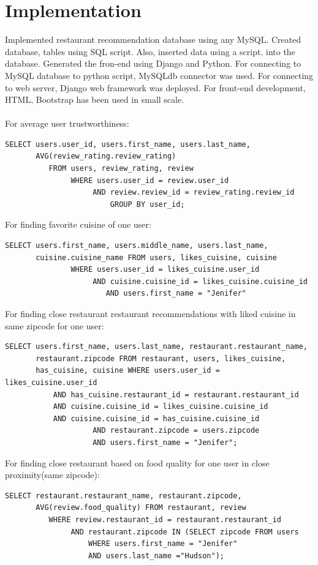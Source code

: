 \documentclass[12pt]{report}
\begin{document}
\section*{Implementation}
Implemented restaurant recommendation database using any MySQL. Created database, tables using SQL script. Also, inserted data using a script.
into the database. Generated the fron-end using Django and Python. For connecting to MySQL database to python script, MySQLdb connector was used. For connecting to web server, Django web framework was deployed. For front-end development, HTML, Bootstrap has been used in small scale.\\\\
For average user trustworthiness:
\begin{verbatim}
SELECT users.user_id, users.first_name, users.last_name,
       AVG(review_rating.review_rating)
          FROM users, review_rating, review
               WHERE users.user_id = review.user_id 
                    AND review.review_id = review_rating.review_id
                        GROUP BY user_id;
\end{verbatim}
For finding favorite cuisine of one user:
\begin{verbatim}
SELECT users.first_name, users.middle_name, users.last_name,
       cuisine.cuisine_name FROM users, likes_cuisine, cuisine
               WHERE users.user_id = likes_cuisine.user_id 
                    AND cuisine.cuisine_id = likes_cuisine.cuisine_id
                       AND users.first_name = "Jenifer"
\end{verbatim}
For finding close restaurant restaurant recommendations with liked cuisine in same zipcode for one user:
\begin{verbatim}
SELECT users.first_name, users.last_name, restaurant.restaurant_name,
       restaurant.zipcode FROM restaurant, users, likes_cuisine,
       has_cuisine, cuisine WHERE users.user_id = likes_cuisine.user_id
           AND has_cuisine.restaurant_id = restaurant.restaurant_id 
           AND cuisine.cuisine_id = likes_cuisine.cuisine_id
           AND cuisine.cuisine_id = has_cuisine.cuisine_id
                    AND restaurant.zipcode = users.zipcode 
                    AND users.first_name = "Jenifer";
\end{verbatim}

For finding close restaurant based on food quality for one user in close proximity(same zipcode):
\begin{verbatim}
SELECT restaurant.restaurant_name, restaurant.zipcode,
       AVG(review.food_quality) FROM restaurant, review 
          WHERE review.restaurant_id = restaurant.restaurant_id
               AND restaurant.zipcode IN (SELECT zipcode FROM users
                   WHERE users.first_name = "Jenifer" 
                   AND users.last_name ="Hudson");

\end{verbatim}
\end{document}
